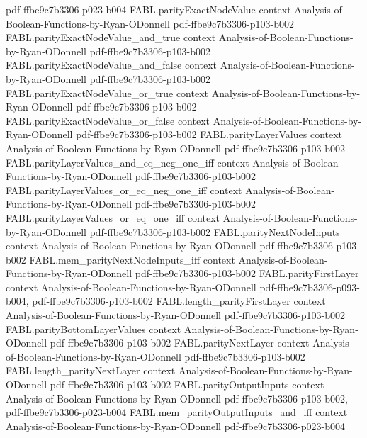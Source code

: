 \begin{theorem}
  {pdf-ffbe9c7b3306-p023-b004}
\proofstep
  {FABL.parityExactNodeValue}
  {context}
  {Analysis-of-Boolean-Functions-by-Ryan-ODonnell}
  {pdf-ffbe9c7b3306-p103-b002}
\proofstep
  {FABL.parityExactNodeValue_and_true}
  {context}
  {Analysis-of-Boolean-Functions-by-Ryan-ODonnell}
  {pdf-ffbe9c7b3306-p103-b002}
\proofstep
  {FABL.parityExactNodeValue_and_false}
  {context}
  {Analysis-of-Boolean-Functions-by-Ryan-ODonnell}
  {pdf-ffbe9c7b3306-p103-b002}
\proofstep
  {FABL.parityExactNodeValue_or_true}
  {context}
  {Analysis-of-Boolean-Functions-by-Ryan-ODonnell}
  {pdf-ffbe9c7b3306-p103-b002}
\proofstep
  {FABL.parityExactNodeValue_or_false}
  {context}
  {Analysis-of-Boolean-Functions-by-Ryan-ODonnell}
  {pdf-ffbe9c7b3306-p103-b002}
\proofstep
  {FABL.parityLayerValues}
  {context}
  {Analysis-of-Boolean-Functions-by-Ryan-ODonnell}
  {pdf-ffbe9c7b3306-p103-b002}
\proofstep
  {FABL.parityLayerValues_and_eq_neg_one_iff}
  {context}
  {Analysis-of-Boolean-Functions-by-Ryan-ODonnell}
  {pdf-ffbe9c7b3306-p103-b002}
\proofstep
  {FABL.parityLayerValues_or_eq_neg_one_iff}
  {context}
  {Analysis-of-Boolean-Functions-by-Ryan-ODonnell}
  {pdf-ffbe9c7b3306-p103-b002}
\proofstep
  {FABL.parityLayerValues_or_eq_one_iff}
  {context}
  {Analysis-of-Boolean-Functions-by-Ryan-ODonnell}
  {pdf-ffbe9c7b3306-p103-b002}
\proofstep
  {FABL.parityNextNodeInputs}
  {context}
  {Analysis-of-Boolean-Functions-by-Ryan-ODonnell}
  {pdf-ffbe9c7b3306-p103-b002}
\proofstep
  {FABL.mem_parityNextNodeInputs_iff}
  {context}
  {Analysis-of-Boolean-Functions-by-Ryan-ODonnell}
  {pdf-ffbe9c7b3306-p103-b002}
\proofstep
  {FABL.parityFirstLayer}
  {context}
  {Analysis-of-Boolean-Functions-by-Ryan-ODonnell}
  {pdf-ffbe9c7b3306-p093-b004,
    pdf-ffbe9c7b3306-p103-b002}
\proofstep
  {FABL.length_parityFirstLayer}
  {context}
  {Analysis-of-Boolean-Functions-by-Ryan-ODonnell}
  {pdf-ffbe9c7b3306-p103-b002}
\proofstep
  {FABL.parityBottomLayerValues}
  {context}
  {Analysis-of-Boolean-Functions-by-Ryan-ODonnell}
  {pdf-ffbe9c7b3306-p103-b002}
\proofstep
  {FABL.parityNextLayer}
  {context}
  {Analysis-of-Boolean-Functions-by-Ryan-ODonnell}
  {pdf-ffbe9c7b3306-p103-b002}
\proofstep
  {FABL.length_parityNextLayer}
  {context}
  {Analysis-of-Boolean-Functions-by-Ryan-ODonnell}
  {pdf-ffbe9c7b3306-p103-b002}
\proofstep
  {FABL.parityOutputInputs}
  {context}
  {Analysis-of-Boolean-Functions-by-Ryan-ODonnell}
  {pdf-ffbe9c7b3306-p103-b002,
    pdf-ffbe9c7b3306-p023-b004}
\proofstep
  {FABL.mem_parityOutputInputs_and_iff}
  {context}
  {Analysis-of-Boolean-Functions-by-Ryan-ODonnell}
  {pdf-ffbe9c7b3306-p023-b004}

\end{theorem}
